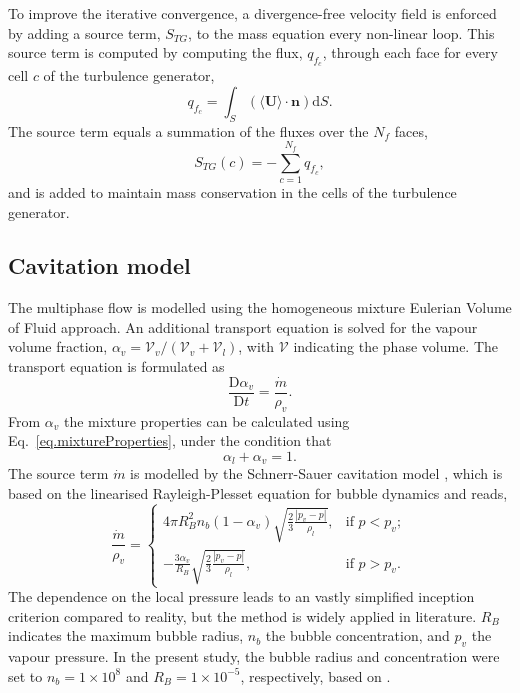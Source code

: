 \documentclass[a4paper,10pt,preprint,3p]{elsarticle}
\begin{document}
To improve the iterative convergence, a divergence-free velocity field is enforced by adding a source term, $S_{TG}$, to the mass equation every non-linear loop. This source term is computed by computing the flux, $q_{f_c}$, through each face for every cell $c$ of the turbulence generator,
\begin{equation}\label{eq.TG_sourceTermCorrection}
q_{f_c} = \int_S \left( \langle \mathbf{U} \rangle \cdot \mathbf{n} \right) \mathrm{d} S.
\end{equation}
The source term equals a summation of the fluxes over the $N_f$ faces,
\begin{equation}
S_{TG}(c) = - \sum\limits_{c = 1}^{N_f} q_{f_c},
\end{equation}
and is added to maintain mass conservation in the cells of the turbulence generator.










\subsection{Cavitation model}
\label{sec.cavitationModel}
The multiphase flow is modelled using the homogeneous mixture Eulerian Volume of Fluid approach. An additional transport equation is solved for the vapour volume fraction, $\alpha_v=\mathcal{V}_v/(\mathcal{V}_v+\mathcal{V}_l)$, with $\mathcal{V}$ indicating the phase volume. The transport equation is formulated as
\begin{equation}
\frac{\mathrm{D} \alpha_{v}}{\mathrm{D}t}=\frac{\dot{m}}{\rho_{v}}.
\end{equation}
From $\alpha_v$ the mixture properties can be calculated using Eq.~\ref{eq.mixtureProperties}, under the condition that
\begin{equation}
\alpha_l + \alpha_v = 1.
\end{equation}
The source term $\dot{m}$ is modelled by the Schnerr-Sauer cavitation model \cite{schnerr2001physical,hoekstra2009partial}, which is based on the linearised Rayleigh-Plesset equation for bubble dynamics and reads,
\begin{equation}
  \frac{\dot{m}}{\rho_v} =
  \begin{cases}
   4\pi R_B^2n_b(1-\alpha_v)\sqrt{\frac{2}{3}\frac{|p_v-p|}{\rho_l}}, & \text{if } p<p_v; \\
   -\frac{3\alpha_v}{R_B}\sqrt{\frac{2}{3}\frac{|p_v-p|}{\rho_l}},    & \text{if } p>p_v.
  \end{cases}
\end{equation}
The dependence on the local pressure leads to an vastly simplified inception criterion compared to reality, but the method is widely applied in literature. $R_B$ indicates the maximum bubble radius, $n_b$ the bubble concentration, and $p_v$ the vapour pressure. In the present study, the bubble radius and concentration were set to $n_b =1 \times 10^8$ and $R_B = 1 \times 10^{-5}$, respectively, based on \cite{vaz2017improved}.








\footnotesize
\setlength{\bibsep}{0pt plus 0.3ex}








\end{document}
